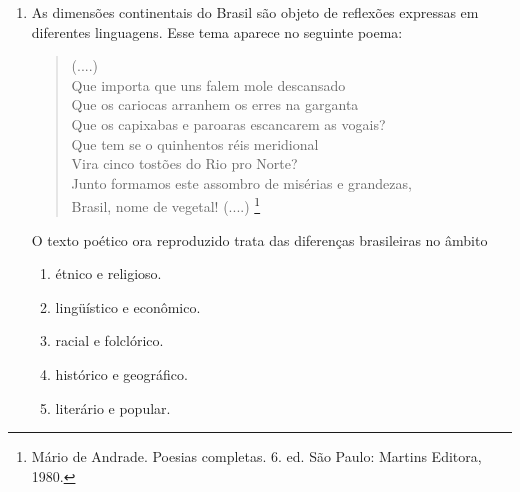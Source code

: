 \documentclass[10pt,a4paper]{article}
\begin{document}
\begin{multicols}{2}
\begin{enumerate}
	\item As dimens\~oes continentais do Brasil s\~ao objeto de reflex\~oes expressas em diferentes  linguagens. Esse tema aparece no seguinte poema: \\
	\begin{quote}
	(....)\\
Que importa que uns falem mole descansado\\
Que os cariocas arranhem os erres na garganta\\
Que os capixabas e paroaras escancarem as vogais?\\
Que tem se o quinhentos r\'eis meridional\\
Vira cinco tost\~oes do Rio pro Norte?\\
Junto formamos este assombro de mis\'erias e grandezas,\\
Brasil, nome de vegetal! (....) \footnote{M\'ario de Andrade. Poesias completas. 6. ed. S\~ao Paulo: Martins Editora, 1980.}\\
	\end{quote}
	O texto po\'etico ora reproduzido trata das diferen\c{c}as brasileiras no âmbito
		\begin{enumerate}
		\item \'etnico e religioso.
		\item lingü\'istico e econ\^omico.
		\item racial e folcl\'orico.
		\item hist\'orico e geogr\'afico.
		\item liter\'ario e popular.
		\end{enumerate}


\end{enumerate}
\end{multicols}
\end{document}

